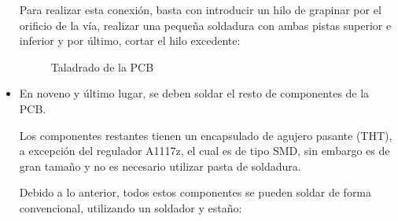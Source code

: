 \begin{itemize}
    Para realizar esta conexión, basta con introducir un hilo de grapinar por el orificio de la vía, realizar una pequeña soldadura con ambas pistas superior e inferior y por último, cortar el hilo excedente:
    
    \begin{figure}[H]
    \centering
    \caption{Taladrado de la \ac{PCB}}
    \label{fig:lego}
    \end{figure}
    
    
    \item En noveno y último lugar, se deben soldar el resto de componentes de la \ac{PCB}.
    
    Los componentes restantes tienen un encapsulado de agujero pasante (\ac{THT}), a excepción del regulador A1117z, el cual es de tipo \ac{SMD}, sin embargo es de gran tamaño y no es necesario utilizar pasta de soldadura.
    
    Debido a lo anterior, todos estos componentes se pueden soldar de forma convencional, utilizando un soldador y estaño:
    

\end{itemize}
